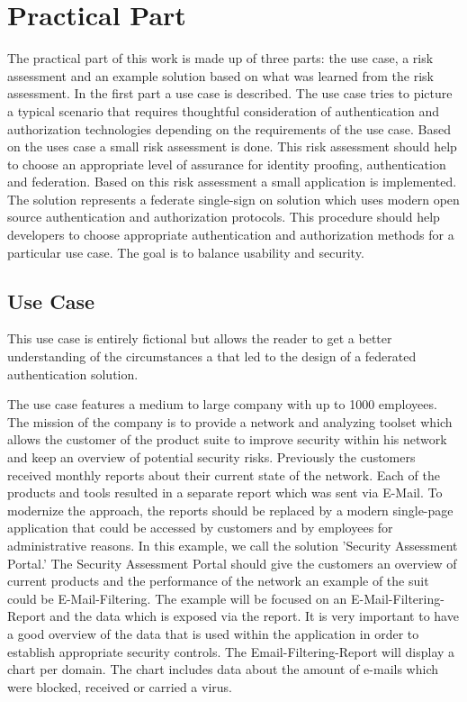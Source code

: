 \chapter{Practical Part}\label{chap:practicalPart}
\chapterstart

The practical part of this work is made up of three parts: the use case, a risk assessment and an example solution based on what was learned from the risk assessment. In the first part a use case is described. The use case tries to picture a typical scenario that requires thoughtful consideration of authentication and authorization technologies depending on the requirements of the use case. Based on the uses case a small risk assessment is done. This risk assessment should help to choose an appropriate level of assurance for identity proofing, authentication and federation. Based on this risk assessment a small application is implemented. The solution represents a federate single-sign on solution which uses modern open source authentication and authorization protocols. This procedure should help developers to choose appropriate authentication and authorization methods for a particular use case. The goal is to balance usability and security. 

\section{Use Case}
\label{usecase}
This use case is entirely fictional but allows the reader to get a better understanding of the circumstances a that led to the design of a federated authentication solution. 

The use case features a medium to large company with up to 1000 employees. The mission of the company is to provide a network and analyzing toolset which allows the customer of the product suite to improve security within his network and keep an overview of potential security risks. Previously the customers received monthly reports about their current state of the network. Each of the products and tools resulted in a separate report which was sent via E-Mail. To modernize the approach, the reports should be replaced by a modern single-page application that could be accessed by customers and by employees for administrative reasons. In this example, we call the solution 'Security Assessment Portal.' The Security Assessment Portal should give the customers an overview of current products and the performance of the network an example of the suit could be E-Mail-Filtering. The example will be focused on an E-Mail-Filtering-Report and the data which is exposed via the report. It is very important to have a good overview of the data that is used within the application in order to establish appropriate security controls. The Email-Filtering-Report will display a chart per domain. The chart includes data about the amount of e-mails which were blocked, received or carried a virus. 

